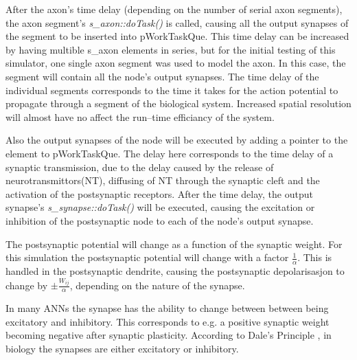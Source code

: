 	After the axon's time delay (depending on the number of serial axon segments), the axon segment's \emph{s\_axon::doTask()} is called, 
																			causing all the output synapses of the segment to be inserted into pWorkTaskQue.
	This time delay can be increased by having multible s\_axon elements in series, but for the initial testing of this simulator, one single axon segment was used to model the axon.
	In this case, the segment will contain all the node's output synapses.
	The time delay of the individual segments corresponds to the time it takes for the action potential to propagate through a segment of the biological system.
	Increased spatial resolution will almost have no affect the run--time efficiancy of the system. %

	Also the output synapses of the node will be executed by adding a pointer to the element to pWorkTaskQue.
	The delay here corresponds to the time delay of a synaptic transmission, due to the delay caused by the release of neurotransmittors(NT), diffusing of NT through the synaptic cleft and the activation of the postsynaptic receptors.
	After the time delay, the output synapse's \emph{s\_synapse::doTask()} will be executed, causing the excitation or inhibition of the postsynaptic node to each of the node's output synapse. 
	
	The postsynaptic potential will change as a function of the synaptic weight. For this simulation the postsynaptic potential will change with a factor $\frac{1}{\alpha}$. 
	This is handled in the postsynaptic dendrite, causing the postsynaptic depolarisasjon to change by $\pm \frac{W_{ij}}{\alpha}$, depending on the nature of the synapse.

	In many ANNs the synapse has the ability to change between between being excitatory and inhibitory. 
	This corresponds to e.g. a positive synaptic weight becoming negative after synaptic plasticity.
	According to Dale's Principle %
		, in biology the synapses are either excitatory or inhibitory.

